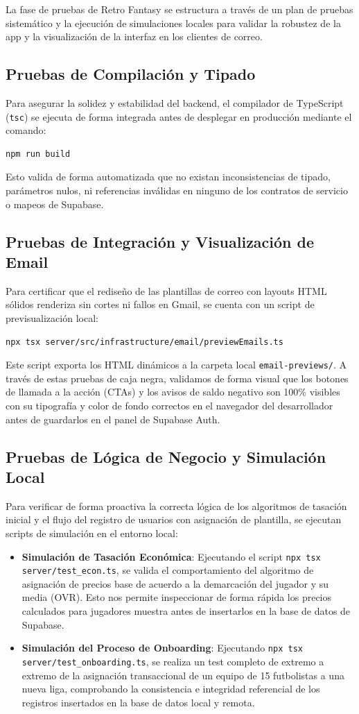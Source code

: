 La fase de pruebas de Retro Fantasy se estructura a través de un plan de pruebas sistemático y la ejecución de simulaciones locales para validar la robustez de la app y la visualización de la interfaz en los clientes de correo.

\subsection{Pruebas de Compilación y Tipado}
Para asegurar la solidez y estabilidad del backend, el compilador de TypeScript (\texttt{tsc}) se ejecuta de forma integrada antes de desplegar en producción mediante el comando:
\begin{lstlisting}[language=bash]
npm run build
\end{lstlisting}
Esto valida de forma automatizada que no existan inconsistencias de tipado, parámetros nulos, ni referencias inválidas en ninguno de los contratos de servicio o mapeos de Supabase.

\subsection{Pruebas de Integración y Visualización de Email}
Para certificar que el rediseño de las plantillas de correo con layouts HTML sólidos renderiza sin cortes ni fallos en Gmail, se cuenta con un script de previsualización local:
\begin{lstlisting}[language=bash]
npx tsx server/src/infrastructure/email/previewEmails.ts
\end{lstlisting}
Este script exporta los HTML dinámicos a la carpeta local \texttt{email-previews/}. A través de estas pruebas de caja negra, validamos de forma visual que los botones de llamada a la acción (CTAs) y los avisos de saldo negativo son 100\% visibles con su tipografía y color de fondo correctos en el navegador del desarrollador antes de guardarlos en el panel de Supabase Auth.

\subsection{Pruebas de Lógica de Negocio y Simulación Local}
Para verificar de forma proactiva la correcta lógica de los algoritmos de tasación inicial y el flujo del registro de usuarios con asignación de plantilla, se ejecutan scripts de simulación en el entorno local:
\begin{itemize}
    \item \textbf{Simulación de Tasación Económica}: Ejecutando el script \texttt{npx tsx server/test\_econ.ts}, se valida el comportamiento del algoritmo de asignación de precios base de acuerdo a la demarcación del jugador y su media (OVR). Esto nos permite inspeccionar de forma rápida los precios calculados para jugadores muestra antes de insertarlos en la base de datos de Supabase.
    \item \textbf{Simulación del Proceso de Onboarding}: Ejecutando \texttt{npx tsx server/test\_onboarding.ts}, se realiza un test completo de extremo a extremo de la asignación transaccional de un equipo de 15 futbolistas a una nueva liga, comprobando la consistencia e integridad referencial de los registros insertados en la base de datos local y remota.
\end{itemize}
